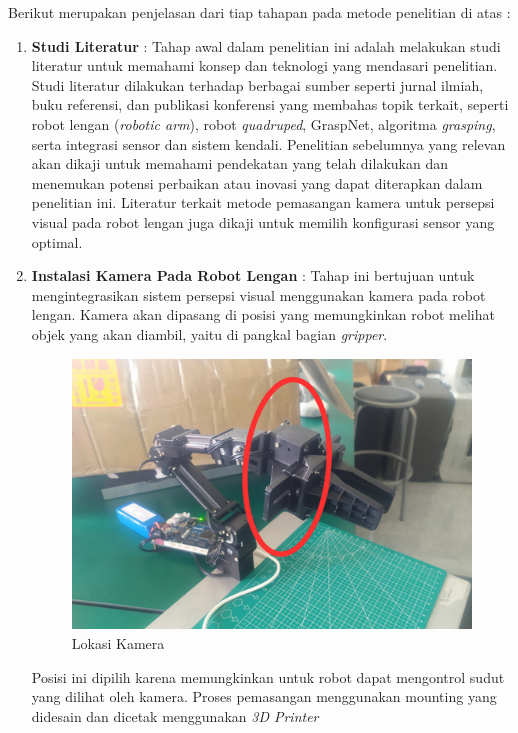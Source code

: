Berikut merupakan penjelasan dari tiap tahapan pada metode penelitian di atas :
\begin{enumerate}
  \item \textbf{Studi Literatur} : Tahap awal dalam penelitian ini adalah melakukan studi literatur untuk memahami konsep
  dan teknologi yang mendasari penelitian. Studi literatur dilakukan terhadap berbagai sumber
  seperti jurnal ilmiah, buku referensi, dan publikasi konferensi yang membahas topik terkait,
  seperti robot lengan (\emph{robotic arm}), robot \emph{quadruped}, GraspNet, algoritma \emph{grasping}, serta
  integrasi sensor dan sistem kendali. Penelitian sebelumnya yang relevan akan dikaji untuk
  memahami pendekatan yang telah dilakukan dan menemukan potensi perbaikan atau inovasi
  yang dapat diterapkan dalam penelitian ini. Literatur terkait metode pemasangan kamera
  untuk persepsi visual pada robot lengan juga dikaji untuk memilih konfigurasi sensor yang optimal.

  \item \textbf{Instalasi Kamera Pada Robot Lengan} : Tahap ini bertujuan untuk mengintegrasikan
  sistem persepsi visual menggunakan kamera pada robot lengan. Kamera akan dipasang di posisi
  yang memungkinkan robot melihat objek yang akan diambil, yaitu di pangkal bagian \emph{gripper}.
  \begin{figure} [H] \centering
    \includegraphics[scale=0.5]{gambar/penempatan kamera.png}
    \caption{Lokasi Kamera}
    \label{fig:lokasi_kamera}
  \end{figure}
  Posisi ini dipilih karena memungkinkan untuk robot dapat mengontrol sudut yang dilihat oleh kamera.
  Proses pemasangan menggunakan mounting yang didesain dan dicetak menggunakan \emph{3D Printer}
  

\end{enumerate}
